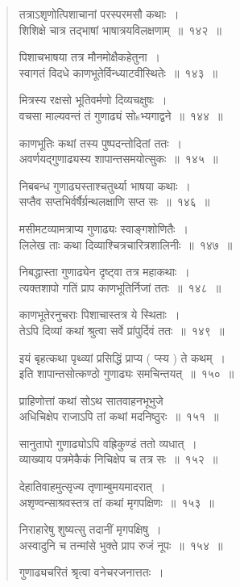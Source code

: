 \documentclass[11pt, openany]{book}
\begin{document}
\begin{multicols}{2}
\begin{quote}
{तत्राऽशृणोत्पिशाचानां परस्परमसौ कथाः~।\\
शिशिक्षे चात्र तद्भाषां भाषात्रयविलक्षणाम्~॥~१४२~॥

पिशाचभाषया तत्र मौनमोक्षैकहेतुना~।\\
स्वागतं विदधे काणभूतेर्विन्ध्याटवीस्थितेः~॥~१४३~॥

मित्रस्य रक्षसो भूतिवर्मणो दिव्यचक्षुषः~।\\
वचसा माल्यवन्तं तं गुणाढ्यं सोsभ्यगाद्वने~॥~१४४~॥

काणभूतिः कथां तस्य पुष्पदन्तोदितां ततः~।\\
अवर्णयद्गुणाढ्यस्य शापान्तसमयोत्सुकः~॥~१४५~॥

निबबन्ध गुणाढ्यस्ताश्चतुर्थ्या भाषया कथाः~।\\
सप्तैव सप्तभिर्वर्षैर्ग्रन्थलक्षाणि सप्त सः~॥~१४६~॥

मसीमटव्यामत्राप्य गुणाढ्यः स्वाङ्गशोणितैः~।\\
लिलेख ताः कथा दिव्याश्चित्रचारित्रशालिनीः~॥~१४७~॥

निबद्धास्ता गुणाढ्येन दृष्ट्वा तत्र महाकथाः~।\\
त्यक्तशापो गतिं प्राप काणभूतिर्निजां ततः~॥~१४८~॥

काणभूतेरनुचराः पिशाचास्तत्र ये स्थिताः~।\\
तेऽपि दिव्यां कथां श्रुत्वा सर्वे प्रांपुर्दिवं ततः~॥~१४९~॥

इयं बृहत्कथा पृथ्व्यां प्रसिद्धिं प्राप्य ( प्स्य ) ते कथम्~।\\
इति शापान्तसोत्कण्ठो गुणाढ्यः समचिन्तयत्~॥~१५०~॥

प्राहिणोत्तां कथां सोऽथ सातवाहनभूभुजे\\
अधिचिक्षेप राजाऽपि तां कथां मदनिष्ठुरः~॥~१५१~॥

सानुतापो गुणाढ्योऽपि वह्रिकुण्डं ततो व्यधात्~।\\
व्याख्याय पत्रमेकैकं निचिक्षेप च तत्र सः~॥~१५२~॥

देहातिवाहमुत्सृज्य तृणाम्बुमयमादरात्~।\\
अशृण्वन्साश्रवस्तत्र तां कथां मृगपक्षिणः~॥~१५३~॥

निराहारेषु शुष्यत्सु तदानीं मृगपक्षिषु~।\\
अस्वादुनि च तन्मांसे भुक्ते प्राप रुजं नूपः~॥~१५४~॥

गुणाढ्यचरितं श्रृत्वा वनेचरजनात्ततः~।}
\end{quote}
\end{multicols}

\newpage
\end{document}
